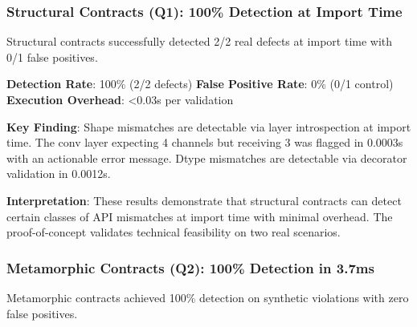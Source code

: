 
\subsubsection{Structural Contracts (Q1): 100\% Detection at Import Time}

Structural contracts successfully detected 2/2 real defects at import time with 0/1 false positives.

\begin{table}[htbp]
\centering
{}
\end{table}

\textbf{Detection Rate}: 100\% (2/2 defects)
\textbf{False Positive Rate}: 0\% (0/1 control)
\textbf{Execution Overhead}: <0.03s per validation

\textbf{Key Finding}: Shape mismatches are detectable via layer introspection at import time. The conv layer expecting 4 channels but receiving 3 was flagged in 0.0003s with an actionable error message. Dtype mismatches are detectable via decorator validation in 0.0012s.

\textbf{Interpretation}: These results demonstrate that structural contracts can detect certain classes of API mismatches at import time with minimal overhead. The proof-of-concept validates technical feasibility on two real scenarios.

\subsubsection{Metamorphic Contracts (Q2): 100\% Detection in 3.7ms}

Metamorphic contracts achieved 100\% detection on synthetic violations with zero false positives.

\begin{table}[htbp]
\centering
{}
\end{table}

